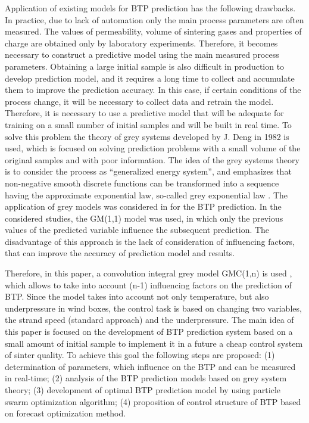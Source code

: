 \documentclass[AMS,STIX2COL]{WileyNJD-v2}
\begin{document}
Application of existing models for BTP prediction has the following drawbacks. In practice, due to lack of automation only the main process parameters are often measured. The values of permeability, volume of sintering gases and properties of charge are obtained only by laboratory experiments. Therefore, it becomes necessary to construct a predictive model using the main measured process parameters. Obtaining a large initial sample is also difficult in production to develop prediction model, and it requires a long time to collect and accumulate them to improve the prediction accuracy. In this case, if certain conditions of the process change, it will be necessary to collect data and retrain the model. Therefore, it is necessary to use a predictive model that will be adequate for training on a small number of initial samples and will be built in real time. To solve this problem the theory of grey systems developed by J. Deng in 1982 is used, which is focused on solving prediction problems with a small volume of the original samples and with poor information. The idea of the grey systems theory is to consider the process as \textquotedblleft generalized energy system\textquotedblright, and emphasizes that non-negative smooth discrete functions can be transformed into a sequence having the approximate exponential law, so-called grey exponential law \cite{DengJ1989}. The application of grey models was considered in \cite{Wu2012, Wu2012b} for the BTP prediction. In the considered studies, the GM(1,1) model was used, in which only the previous values of the predicted variable influence the subsequent prediction. The disadvantage of this approach is the lack of consideration of influencing factors, that can improve the accuracy of prediction model and results. 

Therefore, in this paper, a convolution  integral  grey model GMC(1,n) is used \cite{Tien2005}, which allows to take into account (n-1) influencing factors on the prediction of BTP. Since the model takes into account not only temperature, but also underpressure in wind boxes, the control task is based on changing two variables, the strand speed (standard approach) and the underpressure. 
The main idea of this paper is focused on the development of BTP prediction system based on a small amount of initial sample to implement it in a future a cheap control system of sinter quality. To achieve this goal the following steps are proposed: (1) determination of parameters, which influence on the BTP and can be measured in real-time; (2) analysis of the BTP prediction models based on grey system theory; (3) development of optimal BTP prediction model by using particle swarm optimization algorithm; (4) proposition of control structure of BTP based on forecast optimization method.
\end{document}
